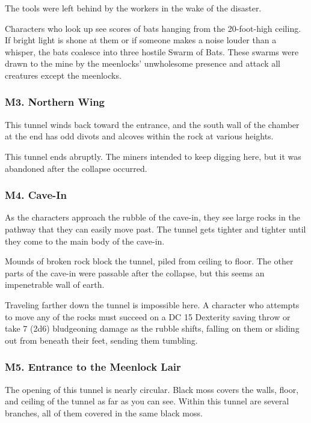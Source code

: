 \documentclass[10pt,a4paper,twoside,bg=print,twocolumn,openany,nodeprecatedcode]{dndbook}
\begin{document}
The tools were left behind by the workers in the wake of the disaster.

Characters who look up see scores of bats hanging from the 20-foot-high ceiling. If bright light is shone at them or if someone makes a noise louder than a whisper, the bats coalesce into three hostile Swarm of Bats. These swarms were drawn to the mine by the meenlocks' unwholesome presence and attack all creatures except the meenlocks.

\subsubsection{M3. Northern Wing}
\begin{DndReadAloud}{}
This tunnel winds back toward the entrance, and the south wall of the chamber at the end has odd divots and alcoves within the rock at various heights.

\end{DndReadAloud}

This tunnel ends abruptly. The miners intended to keep digging here, but it was abandoned after the collapse occurred.

\subsubsection{M4. Cave-In}
As the characters approach the rubble of the cave-in, they see large rocks in the pathway that they can easily move past. The tunnel gets tighter and tighter until they come to the main body of the cave-in.

\begin{DndReadAloud}{}
Mounds of broken rock block the tunnel, piled from ceiling to floor. The other parts of the cave-in were passable after the collapse, but this seems an impenetrable wall of earth.

\end{DndReadAloud}

Traveling farther down the tunnel is impossible here. A character who attempts to move any of the rocks must succeed on a DC 15 Dexterity saving throw or take 7 (2d6) bludgeoning damage as the rubble shifts, falling on them or sliding out from beneath their feet, sending them tumbling.

\subsubsection{M5. Entrance to the Meenlock Lair}
\begin{DndReadAloud}{}
The opening of this tunnel is nearly circular. Black moss covers the walls, floor, and ceiling of the tunnel as far as you can see. Within this tunnel are several branches, all of them covered in the same black moss.

\end{DndReadAloud}
\end{document}
